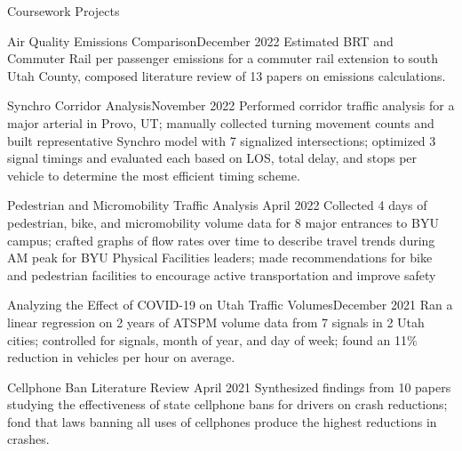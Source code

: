 \documentclass{resume} %
\begin{document}
\begin{rSection}{Coursework Projects}
\begin{pSubsection}{Air Quality Emissions Comparison}{December 2022}
{Estimated BRT and Commuter Rail per passenger emissions for a commuter rail extension to south Utah County, composed literature review of 13 papers on emissions calculations.}
\end{pSubsection}


\begin{pSubsection}{Synchro Corridor Analysis}{November 2022}
{Performed corridor traffic analysis for a major arterial in Provo, UT; manually collected turning movement counts and built representative Synchro model with 7 signalized intersections; optimized 3 signal timings and evaluated each based on LOS, total delay, and stops per vehicle to determine the most efficient timing scheme.}
\end{pSubsection}


\begin{pSubsection}{Pedestrian and Micromobility Traffic Analysis} {April 2022}
{Collected 4 days of pedestrian, bike, and micromobility volume data for 8 major entrances to BYU campus; crafted graphs of flow rates over time to describe travel trends during AM peak for BYU Physical Facilities leaders; made recommendations for bike and pedestrian facilities to encourage active transportation and improve safety}
\end{pSubsection}


\begin{pSubsection}{Analyzing the Effect of COVID-19 on Utah Traffic Volumes}{December 2021}
{Ran a linear regression on 2 years of ATSPM volume data from 7 signals in 2 Utah cities; controlled for signals, month of year, and day of week; found an 11\% reduction in vehicles per hour on average.}
\end{pSubsection}


\begin{pSubsection}{Cellphone Ban Literature Review} {April 2021}
{Synthesized findings from 10 papers studying the effectiveness of state cellphone bans for drivers on crash reductions; fond that laws banning all uses of cellphones produce the highest reductions in crashes.}
\end{pSubsection}
\end{rSection}

\end{document}
